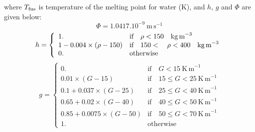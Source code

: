 where $T_{\rm fus}$  is temperature of the melting point for water (K), and $h$, $g$ and $\Phi$ are given below:
\begin{equation}
\Phi = 1.0417.10^{-9}~\mathrm{m\,s}^{-1}
\label{eqn_phimarb}
\end{equation}
\begin{equation}
h = \left\{
    \begin{array}{ll}
       1.& \mbox{if}\quad\rho < 150 \quad \mbox{kg\,m}^{-3}\\
       1-0.004\times(\rho-150) & \mbox{if}\quad 150<\quad\rho < 400 \quad \mbox{kg\,m}^{-3}\\     
       0.& \mbox{otherwise}
    \end{array}
\right.
\label{eqn_hmarb}
\end{equation}
\begin{equation}
g = \left\{
    \begin{array}{ll}
       0. & \mbox{if}\quad G < 15~\mathrm{K\,m}^{-1} \\
       0.01\times(G-15) & \mbox{if} \quad 15\le G< 25~\mathrm{K\,m}^{-1}  \\
       0.1+0.037\times(G-25) & \mbox{if} \quad 25\le G< 40~\mathrm{K\,m}^{-1} \\   
       0.65+0.02\times(G-40) & \mbox{if} \quad 40\le G< 50~\mathrm{K\,m}^{-1} \\
       0.85+0.0075\times(G-50) & \mbox{if} \quad 50\le G< 70~\mathrm{K\,m}^{-1} \\    
       1. &\mbox{otherwise}
    \end{array}
\right.
\label{eqn_gmarb}
\end{equation}


